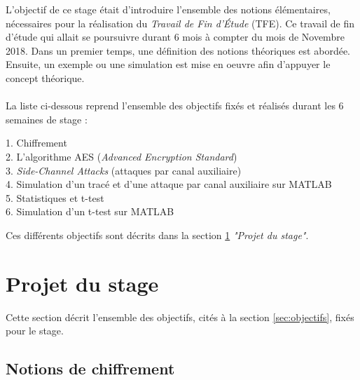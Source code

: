 \documentclass[10pt, oneside, a4paper]{article}
\begin{document}
L'objectif de ce stage était d'introduire l'ensemble des notions élémentaires, nécessaires pour la réalisation du \textit{Travail de Fin d'Étude} (TFE). Ce travail de fin d'étude qui allait se poursuivre durant 6 mois à compter du mois de Novembre 2018. Dans un premier temps, une définition des notions théoriques est abordée. Ensuite, un exemple ou une simulation est mise en oeuvre afin d'appuyer le concept théorique.\\ \\
La liste ci-dessous reprend l'ensemble des objectifs fixés et réalisés durant les 6 semaines de stage : 
\begin{description}
\item[1. Chiffrement] 
\item[2. L'algorithme AES (\textit{Advanced Encryption Standard})]
\item[3. \textit{Side-Channel Attacks} (attaques par canal auxiliaire)]
\item[4. Simulation d'un tracé et d'une attaque par canal auxiliaire sur MATLAB] 
\item[5. Statistiques et t-test] 
\item[6. Simulation d'un t-test sur MATLAB] 
\end{description}
Ces différents objectifs sont décrits dans la section \ref{sec:Projet} \textit{"Projet du stage"}.

\section{Projet du stage}
\label{sec:Projet}

Cette section décrit l'ensemble des objectifs, cités à la section \ref{sec:objectifs}, fixés pour le stage. 

\subsection{Notions  de chiffrement}
\end{document}

